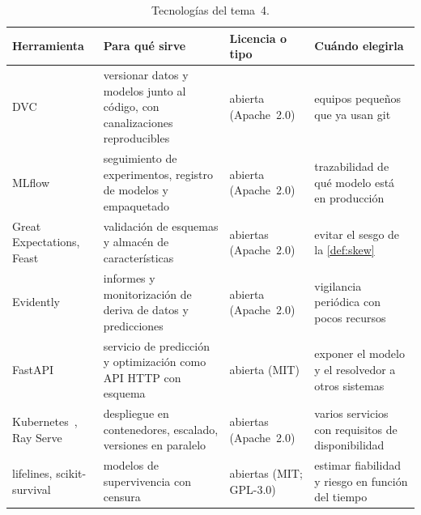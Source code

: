 \begin{table}[h]
\centering\small
\caption{Tecnologías del tema~4.}\label{tab:tec4}
\begin{tabularx}{\textwidth}{@{}>{\raggedright\arraybackslash}p{2.5cm}>{\raggedright\arraybackslash}X>{\raggedright\arraybackslash}p{2.1cm}>{\raggedright\arraybackslash}X@{}}
\toprule
Herramienta & Para qué sirve & Licencia o tipo & Cuándo elegirla \\
\midrule
DVC~\cite{dvc} & versionar datos y modelos junto al código, con canalizaciones reproducibles & abierta (Apache~2.0) & equipos pequeños que ya usan git \\
MLflow~\cite{mlflow} & seguimiento de experimentos, registro de modelos y empaquetado & abierta (Apache~2.0) & trazabilidad de qué modelo está en producción \\
Great Expectations, Feast & validación de esquemas y almacén de características & abiertas (Apache~2.0) & evitar el sesgo de la \cref{def:skew} \\
Evidently~\cite{evidently} & informes y monitorización de deriva de datos y predicciones & abierta (Apache~2.0) & vigilancia periódica con pocos recursos \\
FastAPI~\cite{fastapi} & servicio de predicción y optimización como API HTTP con esquema & abierta (MIT) & exponer el modelo y el resolvedor a otros sistemas \\
Kubernetes~\cite{k8s}, Ray Serve~\cite{ray} & despliegue en contenedores, escalado, versiones en paralelo & abiertas (Apache~2.0) & varios servicios con requisitos de disponibilidad \\
lifelines, scikit-survival & modelos de supervivencia con censura & abiertas (MIT; GPL-3.0) & estimar fiabilidad y riesgo en función del tiempo \\
\bottomrule
\end{tabularx}
\end{table}

